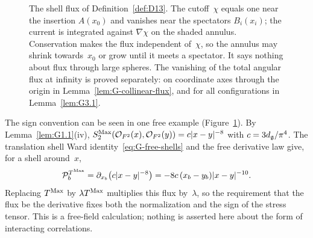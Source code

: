 \begin{figure}[t]
\centering
{}
\caption{The shell flux of Definition~\ref{def:D13}. The cutoff~$\chi$ equals one near the insertion $A(x_0)$ and vanishes near the spectators $B_i(x_i)$; the current is integrated against $\nabla\chi$ on the shaded annulus. Conservation makes the flux independent of~$\chi$, so the annulus may shrink towards~$x_0$ or grow until it meets a spectator. It says nothing about flux through large spheres. The vanishing of the total angular flux at infinity is proved separately: on coordinate axes through the origin in Lemma~\ref{lem:G-collinear-flux}, and for all configurations in Lemma~\ref{lem:G3.1}.}
\label{fig:G-shell}
\end{figure}

The sign convention can be seen in one free example (Figure~\ref{fig:G-shell}). By Lemma~\ref{lem:G1.1}(iv), $S^{\mathrm{Max}}_2(\mathcal{O}_{F^2}(x),\mathcal{O}_{F^2}(y))=c|x-y|^{-8}$ with $c=3d_{\mathfrak{g}}/\pi^4$. The translation shell Ward identity~\eqref{eq:G-free-shells} and the free derivative law give, for a shell around~$x$,
\begin{equation*}
\mathcal P_b^{T^{\mathrm{Max}}}=\partial_{x_b}\bigl(c|x-y|^{-8}\bigr)=-8c\,(x_b-y_b)|x-y|^{-10}.
\end{equation*}
Replacing $T^{\mathrm{Max}}$ by $\lambda T^{\mathrm{Max}}$ multiplies this flux by~$\lambda$, so the requirement that the flux be the derivative fixes both the normalization and the sign of the stress tensor. This is a free-field calculation; nothing is asserted here about the form of interacting correlations.

